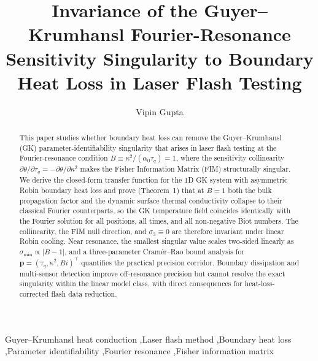 \documentclass[preprint,12pt]{elsarticle}
\begin{document}
\begin{frontmatter}

\title{Invariance of the Guyer--Krumhansl Fourier-Resonance Sensitivity Singularity to Boundary Heat Loss in Laser Flash Testing}

\author[gu]{Vipin Gupta\texorpdfstring{}{}}


\begin{abstract}
This paper studies whether boundary heat loss can remove the Guyer--Krumhansl (GK) parameter-identifiability singularity that arises in laser flash testing at the Fourier-resonance condition $B \equiv \kappa^2 / (\alpha_0 \tau_q) = 1$, where the sensitivity collinearity $\partial \theta / \partial \tau_q = -\partial \theta / \partial \kappa^2$ makes the Fisher Information Matrix (FIM) structurally singular. We derive the closed-form transfer function for the 1D GK system with asymmetric Robin boundary heat loss and prove (Theorem~1) that at $B = 1$ both the bulk propagation factor and the dynamic surface thermal conductivity collapse to their classical Fourier counterparts, so the GK temperature field coincides identically with the Fourier solution for all positions, all times, and all non-negative Biot numbers. The collinearity, the FIM null direction, and $\sigma_3 \equiv 0$ are therefore invariant under linear Robin cooling. Near resonance, the smallest singular value scales two-sided linearly as $\sigma_{\min} \propto |B-1|$, and a three-parameter Cramér--Rao bound analysis for $\bm{p} = (\tau_q, \kappa^2, Bi)^\top$ quantifies the practical precision corridor. Boundary dissipation and multi-sensor detection improve off-resonance precision but cannot resolve the exact singularity within the linear model class, with direct consequences for heat-loss-corrected flash data reduction.
\end{abstract}

\begin{keyword}
Guyer--Krumhansl heat conduction \sep Laser flash method \sep Boundary heat loss \sep Parameter identifiability \sep Fourier resonance \sep Fisher information matrix
\end{keyword}

\end{frontmatter}
\end{document}
